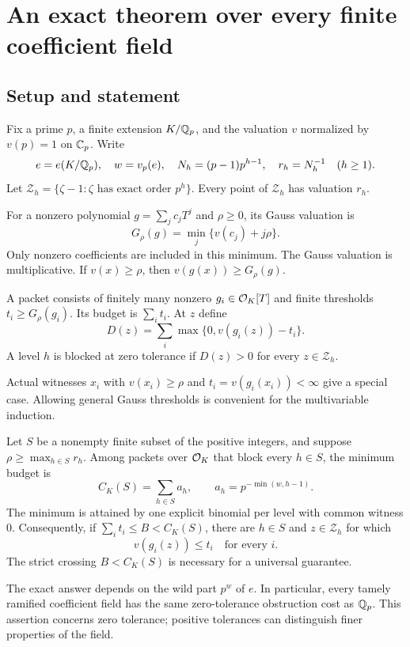 \section{An exact theorem over every finite coefficient field}
\label{sec:scalar}

\subsection{Setup and statement}
Fix a prime $p$, a finite extension $K/\mathbb Q_p$, and the valuation $v$ normalized by $v(p)=1$ on $\mathbb C_p$. Write
\[
e=e(K/\mathbb Q_p),\quad w=v_p(e),\quad
N_h=(p-1)p^{h-1},\quad r_h=N_h^{-1}\quad(h\ge1).
\]
Let $\mathcal Z_h=\{\zeta-1:\zeta\text{ has exact order }p^h\}$.
Every point of $\mathcal Z_h$ has valuation $r_h$.

For a nonzero polynomial $g=\sum_jc_jT^j$ and $\rho\ge0$, its Gauss valuation is
\[
G_\rho(g)=\min_j\{v(c_j)+j\rho\}.
\]
Only nonzero coefficients are included in this minimum. The Gauss valuation is multiplicative. If $v(x)\ge\rho$, then $v(g(x))\ge G_\rho(g)$.

\begin{definition}
A packet consists of finitely many nonzero $g_i\in\mathcal O_K[T]$ and finite thresholds $t_i\ge G_\rho(g_i)$. Its budget is $\sum_i t_i$. At $z$ define
\[
D(z)=\sum_i\max\{0,v(g_i(z))-t_i\}.
\]
A level $h$ is blocked at zero tolerance if $D(z)>0$ for every $z\in\mathcal Z_h$.
\end{definition}
Actual witnesses $x_i$ with $v(x_i)\ge\rho$ and $t_i=v(g_i(x_i))<\infty$ give a special case. Allowing general Gauss thresholds is convenient for the multivariable induction.

\begin{theorem}
\label{thm:scalar}
Let $S$ be a nonempty finite subset of the positive integers, and suppose
$\rho\ge\max_{h\in S}r_h$. Among packets over $\mathcal O_K$ that block every $h\in S$, the minimum budget is
\[
 C_K(S)=\sum_{h\in S}a_h,\qquad
 a_h=p^{-\min(w,h-1)}.
\]
The minimum is attained by one explicit binomial per level with common witness $0$. Consequently, if $\sum_i t_i\le B<C_K(S)$, there are $h\in S$ and $z\in\mathcal Z_h$ for which
\[
v(g_i(z))\le t_i\quad\text{for every }i.
\]
The strict crossing $B<C_K(S)$ is necessary for a universal guarantee.
\end{theorem}

The exact answer depends on the wild part $p^w$ of $e$. In particular, every tamely ramified coefficient field has the same zero-tolerance obstruction cost as $\mathbb Q_p$. This assertion concerns zero tolerance; positive tolerances can distinguish finer properties of the field.

